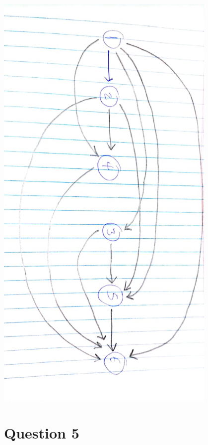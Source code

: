 \documentclass{article}
\begin{document}
\begin{center}
    \includegraphics[width=0.8\textwidth]{toposort3.jpg}
\end{center}
\newpage
\section*{Question 5}
\end{document}
